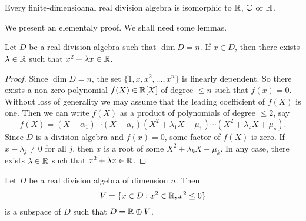 \chapter{}

\chapter{}


\begin{theorem}[Frobenius]
	\label{thm:Frobenius}
	Every finite-dimensioanal real division algebra is isomorphic to $\mathbb{R}$, $\mathbb{C}$
	or $\mathbb{H}$.
\end{theorem}

We present an elementaly proof. We shall need some lemmas. 

\begin{lemma}
	\label{lem:trick_frobenius1}
	Let $D$ be a real division algebra such that $\dim D=n$. If $x\in D$, then
	there exists $\lambda\in\mathbb{R}$ such that $x^2+\lambda x\in\mathbb{R}$.
\end{lemma}

\begin{proof}
	Since $\dim D=n$, the set $\{1,x,x^2,\dots,x^n\}$ is linearly dependent. So
	there exists a non-zero polynomial $f(X)\in\mathbb{R}[X]$ of degree $\leq n$ such
	that $f(x)=0$. Without loss of generality we may assume that the leading
	coefficient of $f(X)$ is one. Then we can write $f(X)$ as a product of
	polynomials of degree $\leq2$, say 
	\[
		f(X)=(X-\alpha_1)\cdots (X-\alpha_r)(X^2+\lambda_1 X+\mu_1)\cdots (X^2+\lambda_s X+\mu_s).
	\]
	Since $D$ is a division algebra and $f(x)=0$, some factor of $f(X)$ is
	zero. If $x-\lambda_j\ne 0$ for all $j$, then $x$ is a root of some
	$X^2+\lambda_k X+\mu_k$. In any case, there exists $\lambda\in\mathbb{R}$ such that
	$x^2+\lambda x\in\mathbb{R}$. 
\end{proof}

\begin{lemma}
	\label{lem:trick_frobenius2}
	Let $D$ be a real division algebra of dimension $n$. Then
	\[
		V=\{x\in D:x^2\in\mathbb{R},x^2\leq 0\}
	\]
	is a subspace of $D$ such that $D=\mathbb{R}\oplus V$.
\end{lemma}

